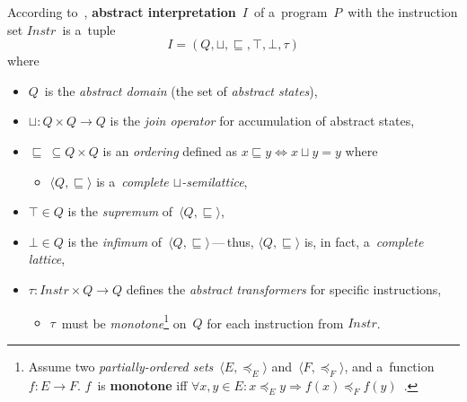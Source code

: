 \begin{definition}
    \label{def:AI}
    According to~\cite{AILatticeModelCousot, savAI}, \textbf{abstract interpretation}~$ I $~of a~program~$ P $~with the instruction set $ Instr $~is a~tuple
    $$
        I = (Q, \sqcup, \sqsubseteq, \top, \bot, \tau)
    $$
    where
    \begin{itemize}
        \item $ Q $~is the \emph{abstract domain} (the set of \emph{abstract states}),

        \item $ \sqcup : Q \times Q \rightarrow Q $ is the \emph{join operator} for accumulation of abstract states,

        \item $ \sqsubseteq\ \subseteq Q \times Q $ is an \emph{ordering} defined as $ x \sqsubseteq y \Longleftrightarrow x \sqcup y = y $ where
            \begin{itemize}
                \item $ \langle Q, \sqsubseteq \rangle $ is a~\emph{complete $ \sqcup $-semilattice},
            \end{itemize}

        \item $ \top \in Q $ is the \emph{supremum} of~$ \langle Q, \sqsubseteq \rangle $,

        \item $ \bot \in Q $ is the \emph{infimum} of~$ \langle Q, \sqsubseteq \rangle $\,---\,thus, $ \langle Q, \sqsubseteq \rangle $ is, in fact, a~\emph{complete lattice},

        \item $ \tau : Instr \times Q \rightarrow Q $ defines the \emph{abstract transformers} for specific instructions,
            \begin{itemize}
                \item $ \tau $~must be \emph{monotone}\footnote{Assume two \emph{partially-ordered sets}~$ \langle E, \preceq_E \rangle $ and~$ \langle F, \preceq_F \rangle $, and a~function $ f : E \rightarrow F $. $ f $~is \textbf{monotone} iff $ \forall x, y \in E : x \preceq_E y \Longrightarrow f(x) \preceq_F f(y) $~\cite{staticAnalysisRival}.} on~$ Q $ for each instruction from $ Instr $.
            \end{itemize}
    \end{itemize}
\end{definition}

